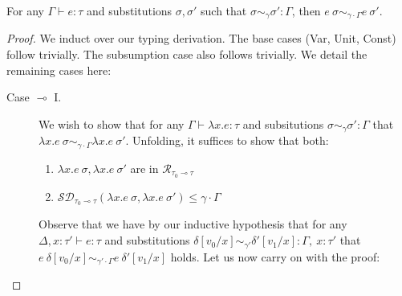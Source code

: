 \begin{theorem}
  For any $\Gamma \vdash e : \tau$ and substitutions $\sigma, \sigma'$ such that
  $\sigma \sim_{\gamma} \sigma' : \Gamma$, then 
  $e~\sigma \sim_{\gamma \cdot \Gamma} e~\sigma'$.
\end{theorem}
\begin{proof}
  We induct over our typing derivation. The base cases (Var, Unit, Const) follow
  trivially. The subsumption case also follows trivially. We detail the
  remaining cases here:
  \begin{description}
    \item[Case $\multimap$ I.] 
      We wish to show that for any $\Gamma \vdash \lambda x . e : \tau$ and
      subsitutions $\sigma \sim_{\gamma} \sigma' : \Gamma$ that $\lambda x .
      e~\sigma \sim_{\gamma \cdot \Gamma} \lambda x . e~\sigma'$. Unfolding, it
      suffices to show that both:
      \begin{enumerate}
        \item $\lambda x . e~\sigma, \lambda x . e~\sigma'$ are in
          $\mathcal{R}_{\tau_0 \multimap \tau}$
        \item $\mathcal{SD}_{\tau_0 \multimap \tau}(\lambda x . e~\sigma,
          \lambda x . e~\sigma') \leq \gamma \cdot \Gamma$
      \end{enumerate}
    
      Observe that we have by our inductive hypothesis that for any $\Delta, x:
      \tau' \vdash e : \tau$ and substitutions 
      $\delta[v_0/x] \sim_{\gamma'} \delta'[v_1/x] : \Gamma,~x : \tau'$ that 
      $e~\delta[v_0/x] \sim_{\gamma' \cdot \Gamma} e~\delta'[v_1/x]$ holds. 
      Let us now carry on with the proof:


\end{description}
\end{proof}
